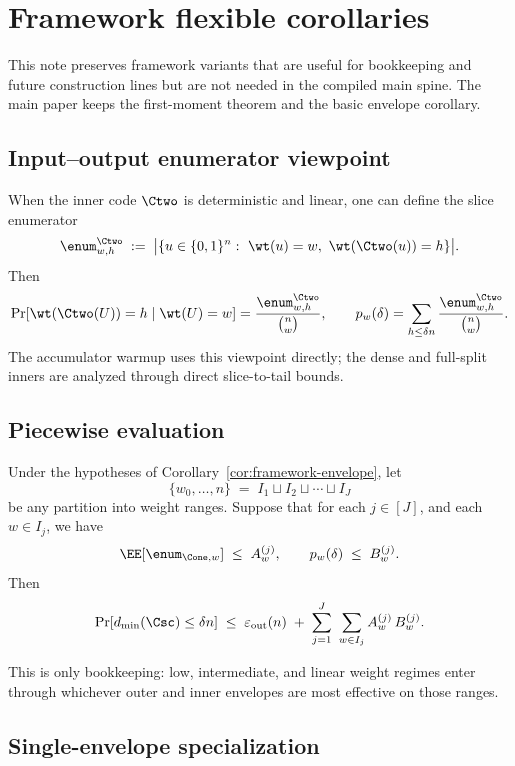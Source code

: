 \section{Framework flexible corollaries}
\label{sec:framework-flexible-corollaries}

This note preserves framework variants that are useful for bookkeeping and
future construction lines but are not needed in the compiled main spine.  The
main paper keeps the first-moment theorem and the basic envelope corollary.

\subsection{Input--output enumerator viewpoint}

When the inner code \(\Ctwo\) is deterministic and linear, one can define the
slice enumerator
\[
\enum^{\Ctwo}_{w,h}
\;:=\;
\bigl|\{u\in\{0,1\}^n:\ \wt(u)=w,\ \wt(\Ctwo(u))=h\}\bigr|.
\]
Then
\[
\Pr[\wt(\Ctwo(U))=h\mid \wt(U)=w]
=
\frac{\enum^{\Ctwo}_{w,h}}{\binom{n}{w}},
\qquad
p_w(\delta)
=
\sum_{h\le \delta n}
\frac{\enum^{\Ctwo}_{w,h}}{\binom{n}{w}} .
\]
The accumulator warmup uses this viewpoint directly; the dense and full-split
inners are analyzed through direct slice-to-tail bounds.

\subsection{Piecewise evaluation}

\begin{corollary}
\label{cor:framework-piecewise}
Under the hypotheses of Corollary~\ref{cor:framework-envelope}, let
\[
\{w_0,\dots,n\} \;=\; I_1 \sqcup I_2 \sqcup \cdots \sqcup I_J
\]
be any partition into weight ranges.
Suppose that for each \(j\in[J]\), and each \(w\in I_j\), we have
\[
\EE[\enum_{\Cone,w}] \;\le\; A^{(j)}_w,
\qquad
p_w(\delta)\;\le\; B^{(j)}_w.
\]
Then
\[
\Pr[d_{\min}(\Csc)\le \delta n]
\;\le\;
\varepsilon_{\mathrm{out}}(n)
\;+\;
\sum_{j=1}^{J}\ \sum_{w\in I_j} A^{(j)}_w\,B^{(j)}_w.
\]
\end{corollary}

This is only bookkeeping: low, intermediate, and linear weight regimes enter
through whichever outer and inner envelopes are most effective on those ranges.

\subsection{Single-envelope specialization}

